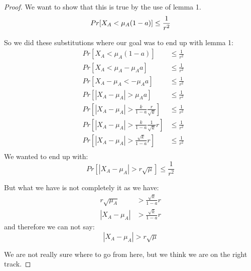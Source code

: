 \begin{proof}
    We want to show that this is true by the use of lemma 1.
    \begin{equation*}
        Pr[X_A < \mu_A(1-a)] \le \frac{1}{r^2}\\
    \end{equation*}

    So we did these substitutions where our goal was to end up with lemma 1:
    \begin{align*}
        &Pr[X_A < \mu_A(1-a)] &\le \frac{1}{r^2}\\
        &Pr[X_A < \mu_A - \mu_A a] &\le \frac{1}{r^2}\\
        &Pr[X_A - \mu_A < - \mu_A a] &\le \frac{1}{r^2}\\
        &Pr[|X_A - \mu_A| > \mu_A a] &\le \frac{1}{r^2}\\
        &Pr[|X_A - \mu_A| > \frac{k}{1-a} \frac{r}{\sqrt{k}}]   &\le \frac{1}{r^2}\\
        &Pr[|X_A - \mu_A| > \frac{k}{1-a} \frac{1}{\sqrt{k}} r] &\le \frac{1}{r^2}\\
        &Pr[|X_A - \mu_A| > \frac{\sqrt{k}}{1-a} r]&\le \frac{1}{r^2}\\
    \end{align*}
    We wanted to end up with:
    \begin{equation*}
        Pr[|X_A - \mu_A| > r \sqrt{\mu}] \le \frac{1}{r^2}
    \end{equation*}

    But what we have is not completely it as we have:
    \begin{align*}
        r \sqrt{\mu_A} &> \frac{\sqrt{k}}{1-a} r\\
        |X_A - \mu_A| &> \frac{\sqrt{k}}{1-a} r
    \end{align*}
    and therefore we can not say:
    \begin{equation*}
        |X_A - \mu_A| > r \sqrt{\mu}
    \end{equation*}

    We are not really sure where to go from here, but we think we are on the
    right track.


\end{proof}
